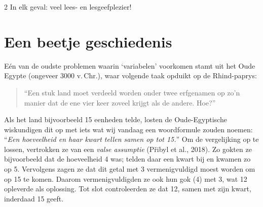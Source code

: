 \begin{multicols}{2}
In elk geval: veel lees- en lesgeefplezier!

\section{Een beetje geschiedenis}
Eén van de oudste problemen waarin `variabelen' voorkomen stamt uit het Oude Egypte (ongeveer 3000 v.\,Chr.), waar volgende taak opduikt op de Rhind-paprys:
\begin{quote}
``Een stuk land moet verdeeld worden onder twee erfgenamen op zo’n manier dat de ene vier keer zoveel krijgt als de andere. Hoe?''
\end{quote}
Als het land bijvoorbeeld 15 eenheden telde, losten de Oude-Egyptische wiskundigen dit op met iets wat wij vandaag een woordformule zouden noemen: ``\textit{Een hoeveelheid en haar kwart tellen samen op tot 15.}'' Om de vergelijking op te lossen, vertrokken ze van een \textit{valse assumptie} (Přibyl et al., 2018). Zo gokten ze bijvoorbeeld dat de hoeveelheid 4 was; telden daar een kwart bij en kwamen zo op 5. Vervolgens zagen ze dat dit getal met 3 vermenigvuldigd moest worden om op 15 te komen. Daarom vermenigvuldigden ze ook hun gok (4) met 3, wat 12 opleverde als oplossing. Tot slot controleerden ze dat 12, samen met zijn kwart, inderdaad 15 geeft.


\end{multicols}
